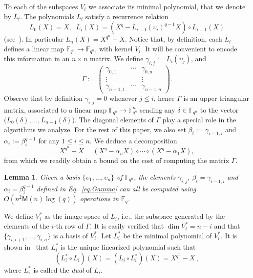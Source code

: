 \documentclass{article}
\newcommand{\ff}[1]{\mathbb{F}_{#1}}
\newcommand{\qq}{q}
\newcommand{\nn}{n}
\newcommand{\qn}{{\qq^\nn}}
\newcommand{\basef}{\ff{\qq}}
\newcommand{\extf}{\ff{\qn}}
\newcommand{\Mul}{\mathsf{M}}
\newcounter{algo}
\newtheorem{Lem}{Lemma}
\begin{document}
To each of the subspaces $V_i$ we associate its minimal polynomial, that we denote by
$L_i$. The polynomials $L_i$ satisfy a recurrence relation 
\begin{equation}
\label{Li_generation}
  L_0(X) = X, \; \;  L_i(X) = (X^\qq - L_{i-1}(\upsilon_i)^{\qq-1}X)\circ L_{i-1}(X)
\end{equation}
(see~\cite[Ch. 11]{mBER84a}). In particular $L_\nn(X)=X^\qn-X$. Notice that, by definition, each $L_i$ defines a linear map
$\extf\to\extf$, with kernel $V_i$. It will be convenient to encode
this information in an $\nn\times\nn$ matrix. We define
$\gamma_{i,j}:=L_i(\upsilon_j)$, and
\begin{equation}
  \label{eq:Gamma}
  \Gamma :=
  \begin{pmatrix}
    \gamma_{0,1} & \cdots & \gamma_{0,\nn}\\
    \vdots & & \vdots\\
    \gamma_{\nn-1,1} & \cdots & \gamma_{\nn-1,\nn}
  \end{pmatrix}.
\end{equation}
Observe that by definition $\gamma_{i,j}=0$ whenever $j\le i$, hence
$\Gamma$ is an upper triangular matrix, associated to a linear map
$\extf\to\extf^\nn$ sending any $\delta\in\extf$ to the vector
$\bigl(L_0(\delta),\dots,\allowbreak L_{n-1}(\delta)\bigr)$. %
The diagonal elements of $\Gamma$ play a special role in the
algorithms we analyze. %
For the rest of this paper, we also set $\beta_i:=\gamma_{i-1,i}$ and
$\alpha_i:=\beta_i^{\qq-1}$ for any $1\le i \le \nn$. %
We deduce a decomposition
\begin{equation}
\label{decomposition_field_eq_gen}
  X^\qn - X = (X^\qq - \alpha_\nn X) \circ \cdots \circ (X^\qq - \alpha_1 X),
\end{equation}
from which we readily obtain a bound on the cost of computing the
matrix $\Gamma$.

\begin{Lem}
  \label{th:gammas}
  Given a basis $\{\upsilon_1,\dots,\upsilon_n\}$ of $\extf$, the
  elements $\gamma_{i,j}$, $\beta_i=\gamma_{i-1,i}$ and
  $\alpha_i=\beta_i^{q-1}$ defined in Eq.~\eqref{eq:Gamma} can all be
  computed using $O(n^2\Mul(n)\log(q))$ operations in $\basef$.
\end{Lem}

We define $V_i^\ast$ as the image space of $L_i$, i.e., the subspace
generated by the elements of the $i$-th row of $\Gamma$.  It is easily verified that
$\dim V_i^\ast=n-i$ and that $\{\gamma_{i,i+1},\dots,\gamma_{i,\nn}\}$
is a basis of $V_i^\ast$. Let $L_i^\ast$ be the minimal polynomial of
$V_i^\ast$. It is shown in~\cite[Ch. 11]{mBER84a} that
$L_i^\ast$ is the unique linearized polynomial such that
\begin{equation}
\label{dual_polynomial}
(L_i^\ast \circ L_i)(X)=(L_i \circ L_i^\ast)(X)=X^\qn-X\,,
\end{equation}
where $L_i^\ast$ is called the \emph{dual} of $L_i$.
\end{document}
